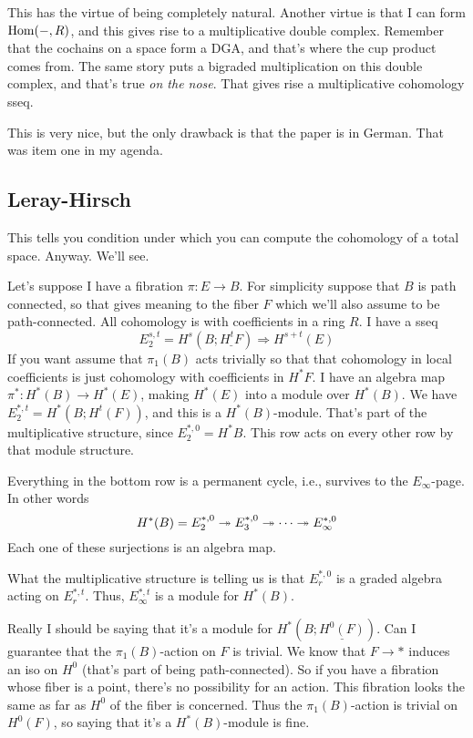 This has the virtue of being completely natural.
Another virtue is that I can form $\operatorname{Hom}(-,R)$, and this gives rise to a multiplicative double complex.
Remember that the cochains on a space form a DGA, and that's where the cup product comes from.
The same story puts a bigraded multiplication on this double complex, and that's true \emph{on the nose}.
That gives rise a multiplicative cohomology sseq.

This is very nice, but the only drawback is that the paper is in German.
That was item one in my agenda.
\subsection{Leray-Hirsch}
This tells you condition under which you can compute the cohomology of a total space.
Anyway.
We'll see.

Let's suppose I have a fibration $\pi:E\to B$.
For simplicity suppose that $B$ is path connected, so that gives meaning to the fiber $F$ which we'll also assume to be path-connected.
All cohomology is with coefficients in a ring $R$.
I have a sseq
$$
E_2^{s,t} = H^s(B;\underline{H^t F}) \Rightarrow H^{s+t}(E)
$$
If you want assume that $\pi_1(B)$ acts trivially so that that cohomology in local coefficients is just cohomology with coefficients in $H^\ast F$.
I have an algebra map $\pi^\ast:H^\ast(B)\to H^\ast(E)$, making $H^\ast(E)$ into a module over $H^\ast(B)$.
We have $E^{\ast,t}_2 = H^\ast(B;H^t(F))$, and this is a $H^\ast(B)$-module.
That's part of the multiplicative structure, since $E_2^{\ast,0} = H^\ast B$.
This row acts on every other row by that module structure.

Everything in the bottom row is a permanent cycle, i.e., survives to the $E_\infty$-page.
In other words
$$
H^\ast(B) = E^{\ast,0}_2 \twoheadrightarrow E^{\ast,0}_3 \twoheadrightarrow \cdots \twoheadrightarrow E^{\ast,0}_\infty
$$
Each one of these surjections is an algebra map.

What the multiplicative structure is telling us is that $E^{\ast,0}_r$ is a graded algebra acting on $E^{\ast,t}_r$.
Thus, $E^{\ast,t}_\infty$ is a module for $H^\ast(B)$.

Really I should be saying that it's a module for $H^\ast(B;\underline{H^0(F)})$.
Can I guarantee that the $\pi_1(B)$-action on $F$ is trivial.
We know that $F\to \ast$ induces an iso on $H^0$ (that's part of being path-connected).
So if you have a fibration whose fiber is a point, there's no possibility for an action.
This fibration looks the same as far as $H^0$ of the fiber is concerned.
Thus the $\pi_1(B)$-action is trivial on $H^0(F)$, so saying that it's a $H^\ast(B)$-module is fine.

